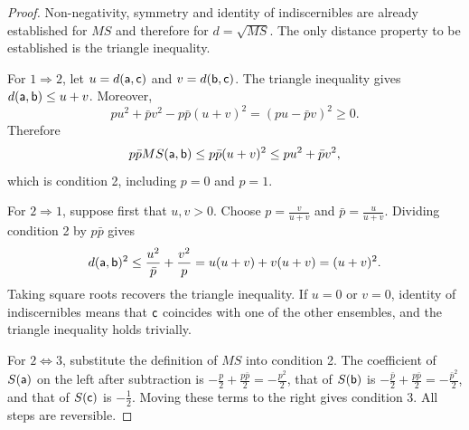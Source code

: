 \begin{proof}
	Non-negativity, symmetry and identity of indiscernibles are already established for $MS$ and therefore for $d=\sqrt{MS}$. The only distance property to be established is the triangle inequality.
	
	For $1\Rightarrow2$, let $u=d(\ens[a],\ens[c])$ and $v=d(\ens[b],\ens[c])$. The triangle inequality gives $d(\ens[a],\ens[b])\leq u+v$. Moreover,
	\begin{equation}
		pu^2+\bar{p}v^2-p\bar{p}(u+v)^2=(pu-\bar{p}v)^2\geq0.
	\end{equation}
	Therefore
	\begin{equation}
		p\bar{p}MS(\ens[a],\ens[b])\leq p\bar{p}(u+v)^2\leq pu^2+\bar{p}v^2,
	\end{equation}
	which is condition 2, including $p=0$ and $p=1$.
	
	For $2\Rightarrow1$, suppose first that $u,v>0$. Choose $p=\frac{v}{u+v}$ and $\bar{p}=\frac{u}{u+v}$. Dividing condition 2 by $p\bar{p}$ gives
	\begin{equation}
		d(\ens[a],\ens[b])^2\leq\frac{u^2}{\bar{p}}+\frac{v^2}{p}
		=u(u+v)+v(u+v)=(u+v)^2.
	\end{equation}
	Taking square roots recovers the triangle inequality. If $u=0$ or $v=0$, identity of indiscernibles means that $\ens[c]$ coincides with one of the other ensembles, and the triangle inequality holds trivially.
	
	For $2\Leftrightarrow3$, substitute the definition of $MS$ into condition 2. The coefficient of $S(\ens[a])$ on the left after subtraction is $-\frac{p}{2}+\frac{p\bar{p}}{2}=-\frac{p^2}{2}$, that of $S(\ens[b])$ is $-\frac{\bar{p}}{2}+\frac{p\bar{p}}{2}=-\frac{\bar{p}^2}{2}$, and that of $S(\ens[c])$ is $-\frac{1}{2}$. Moving these terms to the right gives condition 3. All steps are reversible.
	

\end{proof}
